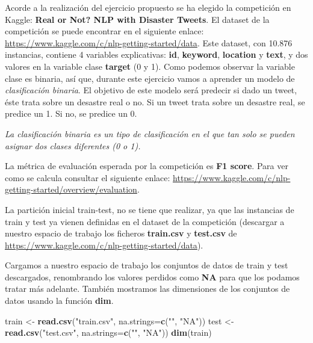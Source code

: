 \documentclass[]{article}
\newenvironment{Shaded}{\begin{snugshade}}{\end{snugshade}}
\newcommand{\DataTypeTok}[1]{\textcolor[rgb]{0.13,0.29,0.53}{#1}}
\newcommand{\KeywordTok}[1]{\textcolor[rgb]{0.13,0.29,0.53}{\textbf{#1}}}
\newcommand{\NormalTok}[1]{#1}
\newcommand{\StringTok}[1]{\textcolor[rgb]{0.31,0.60,0.02}{#1}}
\begin{document}
Acorde a la realización del ejercicio propuesto se ha elegido la
competición en Kaggle: \textbf{Real or Not? NLP with Disaster Tweets}.
El dataset de la competición se puede encontrar en el siguiente enlace:
\url{https://www.kaggle.com/c/nlp-getting-started/data}. Este dataset,
con 10.876 instancias, contiene 4 variables explicativas: \textbf{id},
\textbf{keyword}, \textbf{location} y \textbf{text}, y dos valores en la
variable clase \textbf{target} (0 y 1). Como podemos observar la
variable clase es binaria, así que, durante este ejercicio vamos a
aprender un modelo de \emph{clasificación binaria}. El objetivo de este
modelo será predecir si dado un tweet, éste trata sobre un desastre real
o no. Si un tweet trata sobre un desastre real, se predice un 1. Si no,
se predice un 0.

\emph{La clasificación binaria es un tipo de clasificación en el que tan
solo se pueden asignar dos clases diferentes (0 o 1).}

La métrica de evaluación esperada por la competición es \textbf{F1
score}. Para ver como se calcula consultar el siguiente enlace:
\url{https://www.kaggle.com/c/nlp-getting-started/overview/evaluation}.

La partición inicial train-test, no se tiene que realizar, ya que las
instancias de train y test ya vienen definidas en el dataset de la
competición (descargar a nuestro espacio de trabajo los ficheros
\textbf{train.csv} y \textbf{test.csv} de
\url{https://www.kaggle.com/c/nlp-getting-started/data}).

Cargamos a nuestro espacio de trabajo los conjuntos de datos de train y
test descargados, renombrando los valores perdidos como \textbf{NA} para
que los podamos tratar más adelante. También mostramos las dimensiones
de los conjuntos de datos usando la función \textbf{dim}.

\begin{Shaded}
\begin{Highlighting}[]
\NormalTok{train <-}\StringTok{ }\KeywordTok{read.csv}\NormalTok{(}\StringTok{"train.csv"}\NormalTok{, }\DataTypeTok{na.strings=}\KeywordTok{c}\NormalTok{(}\StringTok{""}\NormalTok{, }\StringTok{"NA"}\NormalTok{))}
\NormalTok{test <-}\StringTok{ }\KeywordTok{read.csv}\NormalTok{(}\StringTok{"test.csv"}\NormalTok{, }\DataTypeTok{na.strings=}\KeywordTok{c}\NormalTok{(}\StringTok{""}\NormalTok{, }\StringTok{"NA"}\NormalTok{))}
\KeywordTok{dim}\NormalTok{(train)}
\end{Highlighting}
\end{Shaded}
\end{document}
